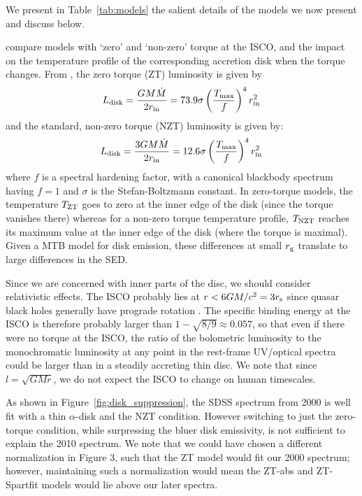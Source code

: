 \documentclass[a4paper,fleqn,usenatbib]{mnras}
\begin{document}
We present in Table~\ref{tab:models} the salient details of the models 
we now present and discuss below. 

\citet{Zimmerman2005} compare models with `zero' and `non-zero' torque
at the ISCO, and the impact on the temperature profile of the
corresponding accretion disk when the torque changes.  From
\citet{Zimmerman2005}, the zero torque (ZT) luminosity is given by
\begin{equation}
L_{\rm disk}   =  \frac{G M \dot{M}}  {2 r_{\rm in}}    = 73.9 \sigma\left ( \frac{T_{\rm max}}{f}  \right )^{4}  r^{2}_{\rm in} 
\end{equation}
and the standard, non-zero torque (NZT) luminosity is given by:
\begin{equation}
L_{\rm disk} = \frac{3 G M \dot{M}}  {2 r_{\rm in}}    = 12.6 \sigma\left ( \frac{T_{\rm max}}{f}  \right )^{4}  r^{2}_{\rm in} 
\end{equation} 
where $f$ is a spectral hardening factor, with a canonical blackbody
spectrum having $f=1$ and $\sigma$ is the Stefan-Boltzmann constant.
In zero-torque models, the temperature $T_{\rm ZT}$ goes to zero at
the inner edge of the disk (since the torque vanishes there) whereas
for a non-zero torque temperature profile, $T_{\rm NZT}$ reaches its
maximum value at the inner edge of the disk (where the torque is
maximal). Given a MTB model for disk emission, these differences at
small $r_{\rm g}$ translate to large differences in the SED.

Since we are concerned with inner parts of the disc, we should
consider relativistic effects. The ISCO probably lies at $r <
6GM/c^{2} = 3r_{\rm s}$ since quasar black holes generally have
prograde rotation \citep[e.g., ][]{Reynolds2014, Capellupo2016}. The
specific binding energy at the ISCO is therefore probably larger than
$1 - \sqrt{8/9} \approx 0.057$, so that even if there were no torque
at the ISCO, the ratio of the bolometric luminosity to the
monochromatic luminosity at any point in the rest-frame UV/optical
spectra could be larger than in a steadily accreting thin disc. We
note that since $l = \sqrt{GMr}$, we do not expect the ISCO
to change on human timescales.
 
As shown in Figure~\ref{fig:disk_suppression}, the SDSS spectrum from
2000 is well fit with a thin \citet{SS73} $\alpha$-disk and the NZT
condition.  However switching to just the zero-torque condition, while
surpressing the bluer disk emissivity, is not sufficient to explain
the 2010 spectrum. We note that we could have chosen a different
normalization in Figure 3, such that the ZT model would fit our 2000
spectrum; however, maintaining such a normalization would mean the
ZT-abs and ZT-Spartfit models would lie above our later spectra.
\end{document}
